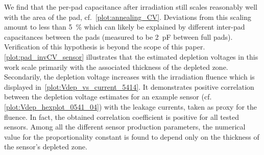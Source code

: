 We find that the per-pad capacitance after irradiation still scales reasonably well with the area of the pad, cf.~\ref{plot:annealing_CV}.
Deviations from this scaling amount to less than \SI{5}{\percent} which can likely be explained by different inter-pad capacitances between the pads (measured to be \SI{2}{\pico\farad} between full pads).
Verification of this hypothesis is beyond the scope of this paper. 
\ref{plot:pad_invCV_sensor} illustrates that the estimated depletion voltages in this work scale primarily with the associated thickness of the depleted zone. 
Secondarily, the depletion voltage increases with the irradiation fluence which is displayed in~\ref{plot:Vdep_vs_current_5414}.
It demonstrates positive correlation between the depletion voltage estimates for an example sensor (cf. \ref{plot:Vdep_hexplot_0541_04}) with the leakage currents, taken as proxy for the fluence.
In fact, the obtained correlation coefficient is positive for all tested sensors. 
Among all the different sensor production parameters, the numerical value for the proportionality constant is found to depend only on the thickness of the sensor's depleted zone.